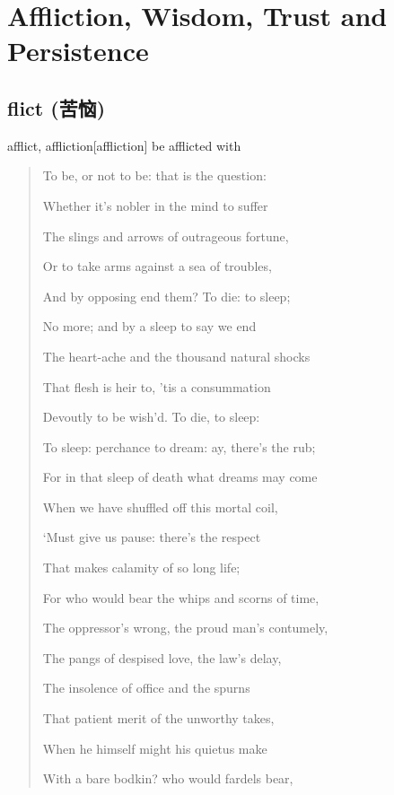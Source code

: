 \chapter{Affliction, Wisdom, Trust and Persistence}

\section{flict (苦恼)}

\begin{DefWord}{afflict, affliction}[affliction]
    be afflicted with
\end{DefWord}

\begin{quotation}
    To be, or not to be: that is the question:

    Whether it's nobler in the mind to suffer

    The slings and arrows of outrageous fortune,

    Or to take arms against a sea of troubles,

    And by opposing end them? To die: to sleep;

    No more; and by a sleep to say we end

    The heart-ache and the thousand natural shocks

    That flesh is heir to, 'tis a consummation

    Devoutly to be wish'd. To die, to sleep:

    To sleep: perchance to dream: ay, there's the rub;

    For in that sleep of death what dreams may come

    When we have shuffled off this mortal coil,

    `Must give us pause: there's the respect

    That makes calamity of so long life;

    For who would bear the whips and scorns of time,

    The oppressor's wrong, the proud man's contumely,

    The pangs of despised love, the law's delay,

    The insolence of office and the spurns

    That patient merit of the unworthy takes,

    When he himself might his quietus make

    With a bare bodkin? who would fardels bear,


\end{quotation}
